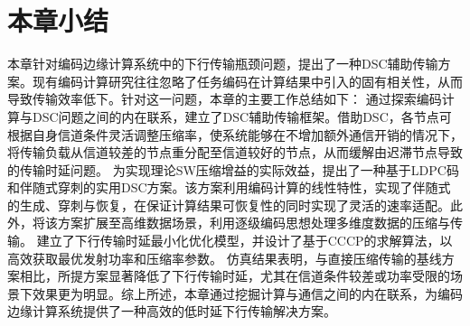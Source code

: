 \section{本章小结}\label{3.5}
本章针对编码边缘计算系统中的下行传输瓶颈问题，提出了一种DSC辅助传输方案。现有编码计算研究往往忽略了任务编码在计算结果中引入的固有相关性，从而导致传输效率低下。针对这一问题，本章的主要工作总结如下：
通过探索编码计算与DSC问题之间的内在联系，建立了DSC辅助传输框架。借助DSC，各节点可根据自身信道条件灵活调整压缩率，使系统能够在不增加额外通信开销的情况下，将传输负载从信道较差的节点重分配至信道较好的节点，从而缓解由迟滞节点导致的传输时延问题。
为实现理论SW压缩增益的实际效益，提出了一种基于LDPC码和伴随式穿刺的实用DSC方案。该方案利用编码计算的线性特性，实现了伴随式的生成、穿刺与恢复，在保证计算结果可恢复性的同时实现了灵活的速率适配。此外，将该方案扩展至高维数据场景，利用逐级编码思想处理多维度数据的压缩与传输。
建立了下行传输时延最小化优化模型，并设计了基于CCCP的求解算法，以高效获取最优发射功率和压缩率参数。
仿真结果表明，与直接压缩传输的基线方案相比，所提方案显著降低了下行传输时延，尤其在信道条件较差或功率受限的场景下效果更为明显。综上所述，本章通过挖掘计算与通信之间的内在联系，为编码边缘计算系统提供了一种高效的低时延下行传输解决方案。







